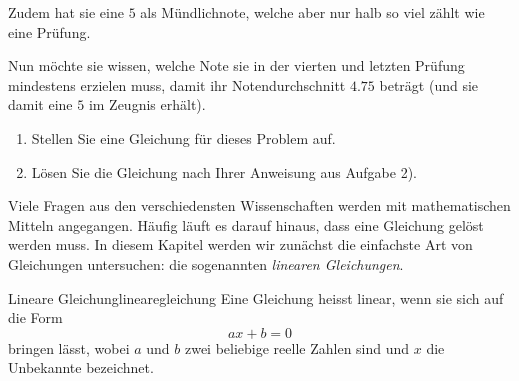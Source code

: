 \begin{LA}
\begin{enumerate}
              Zudem hat sie eine \(5\) als Mündlichnote, welche aber nur halb so viel zählt wie eine Prüfung.

              Nun möchte sie wissen, welche Note sie in der vierten und letzten Prüfung mindestens erzielen muss, damit ihr Notendurchschnitt \(4.75\) beträgt (und sie damit eine \(5\) im Zeugnis erhält).

              \begin{enumerate}
                  \item Stellen Sie eine Gleichung für dieses Problem auf.
                  \item Lösen Sie die Gleichung nach Ihrer Anweisung aus Aufgabe 2).
              \end{enumerate}
    \end{enumerate}
\end{LA}
\clearpage
Viele Fragen aus den verschiedensten Wissenschaften werden mit mathematischen Mitteln angegangen. Häufig läuft es darauf hinaus, dass eine Gleichung gelöst werden muss. In diesem Kapitel werden wir zunächst die einfachste Art von Gleichungen untersuchen: die sogenannten \textit{linearen Gleichungen}.

\begin{definition}{Lineare Gleichung}{linearegleichung}
    Eine Gleichung heisst linear, wenn sie sich auf die Form
    \[
        ax+b=0
    \]
    bringen lässt, wobei \(a\) und \(b\) zwei beliebige reelle Zahlen sind und \(x\) die Unbekannte bezeichnet.
\end{definition}

